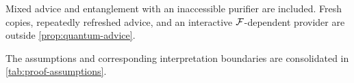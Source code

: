 Mixed advice and entanglement with an inaccessible purifier are included.
Fresh copies, repeatedly refreshed advice, and an interactive
$\mathcal{F}$-dependent provider are outside \cref{prop:quantum-advice}.

The assumptions and corresponding interpretation boundaries are consolidated
in \cref{tab:proof-assumptions}.

